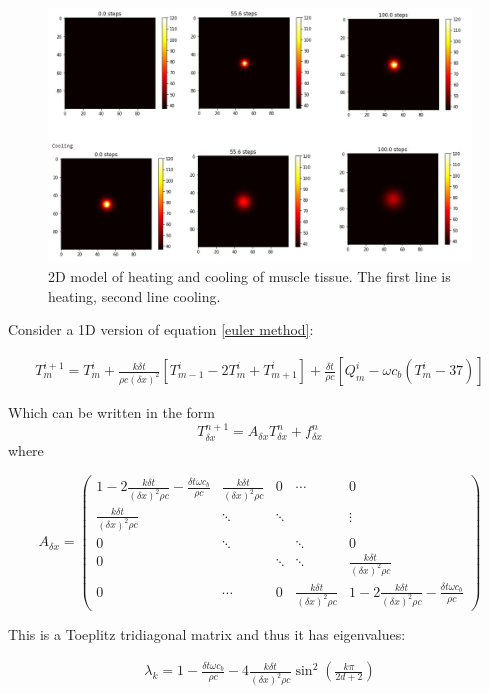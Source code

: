 \documentclass[11pt]{article} %
\begin{document}
\begin{figure}
	\centering
	\includegraphics[width=\linewidth]{"Report_images/2d_homogenous heating and cooling"}
	\caption{2D model of heating and cooling of muscle tissue. The first line is heating, second line cooling.}
	\label{fig:2dhomogenous-heating-and-cooling}
\end{figure}
Consider a 1D version of equation \ref{euler method}:

\begin{eqnarray}
T^{i+1}_m=T^i_m+\frac{k\delta t}{\rho c (\delta x)^2}[T^i_{m-1}-2T^i_m+T^i_{m+1}]+\frac{\delta t}{\rho c}[Q^i_m-\omega c_b (T^i_m-37)]
\end{eqnarray} 

Which can be written in the form $$ T_{\delta x}^{n+1}=A_{\delta x}T_{\delta x}^{n}+f_{\delta x}^{n} $$
where 

$$ A_{\delta x}= \left( \begin{array}{ccccc}
1- 2\frac{k \delta t}{(\delta x)^2 \rho c} -\frac{\delta t \omega c_b}{\rho c }& \frac{k \delta t}{(\delta x)^2 \rho c} & 0 &\cdots  &0  \\ 
\frac{k \delta t}{(\delta x)^2 \rho c}& \ddots  & \ddots  &  & \vdots \\ 
0& \ddots  &  & \ddots  & 0 \\ 
0&  & \ddots  & \ddots  & \frac{k \delta t}{(\delta x)^2 \rho c} \\ 
0& \cdots &  0&\frac{k \delta t}{(\delta x)^2 \rho c}  & 1- 2\frac{k \delta t}{(\delta x)^2 \rho c} -\frac{\delta t \omega c_b}{\rho c }
\end{array}  \right)  $$

This is a  Toeplitz tridiagonal matrix and thus it has eigenvalues:

\begin{eqnarray}
\lambda_k = 1-\frac{\delta t \omega c_b}{\rho c}-4\frac{k \delta t}{(\delta x)^2 \rho c}\sin^2\left( \frac{k\pi}{2d+2}\right) 
\end{eqnarray}
\end{document}
